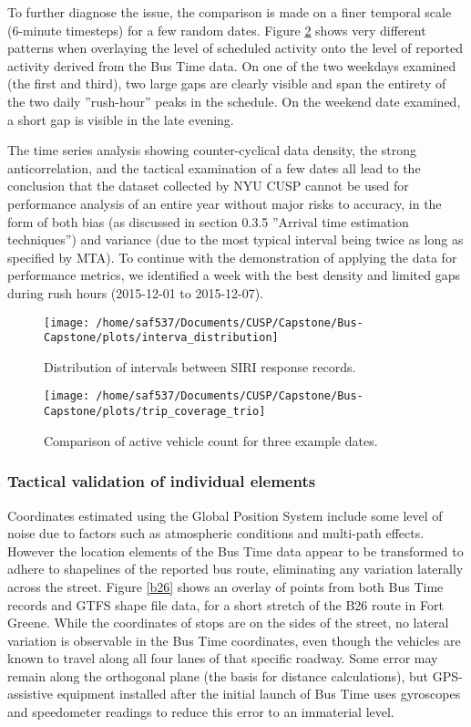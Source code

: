 \documentclass[12pt]{report}
\begin{document}
To further diagnose the issue, the comparison is made on a finer temporal scale (6-minute timesteps) for a few random dates.  Figure \ref{trio} shows very different patterns when overlaying the level of scheduled activity onto the level of reported activity derived from the Bus Time data.  On one of the two weekdays examined  (the first and third), two large gaps are clearly visible and span the entirety of the two daily ''rush-hour'' peaks in the schedule.  On the weekend date examined, a short gap is visible in the late evening.

The time series analysis showing counter-cyclical data density, the strong anticorrelation, and the tactical examination of a few dates all lead to the conclusion that the dataset collected by NYU CUSP cannot be used for performance analysis of an entire year without major risks to accuracy, in the form of both bias (as discussed in section 0.3.5 ''Arrival time estimation techniques'') and variance (due to the most typical interval being twice as long as specified by MTA).  To continue with the demonstration of applying the data for performance metrics, we identified a week with the best density and limited gaps during rush hours (2015-12-01 to 2015-12-07).     
        
\begin{figure}[!ht]
\label{week_day}
  \caption{Distribution of intervals between SIRI response records.}
  \centering
    \texttt{[image: /home/saf537/Documents/CUSP/Capstone/Bus-Capstone/plots/interva\_distribution]}
\end{figure}

\begin{figure}[!ht]
\label{trio}
  \caption{Comparison of active vehicle count for three example dates.}
  \centering
    \texttt{[image: /home/saf537/Documents/CUSP/Capstone/Bus-Capstone/plots/trip\_coverage\_trio]}
\end{figure}


\subsubsection*{Tactical validation of individual elements}


Coordinates estimated using the Global Position System include some level of noise due to factors such as atmospheric conditions and multi-path effects. However the location elements of the Bus Time data appear to be transformed to adhere to shapelines of the reported bus route, eliminating any variation laterally across the street. Figure \ref{b26} shows an overlay of points from both Bus Time records and GTFS shape file data, for a short stretch of the B26 route in Fort Greene.  While the coordinates of stops are on the sides of the street, no lateral variation is observable in the Bus Time coordinates, even though the vehicles are known to travel along all four lanes of that specific roadway. Some error may remain along the orthogonal plane (the basis for distance calculations), but GPS-assistive equipment installed after the initial launch of Bus Time uses gyroscopes and speedometer readings to reduce this error to an immaterial level.
\end{document}
